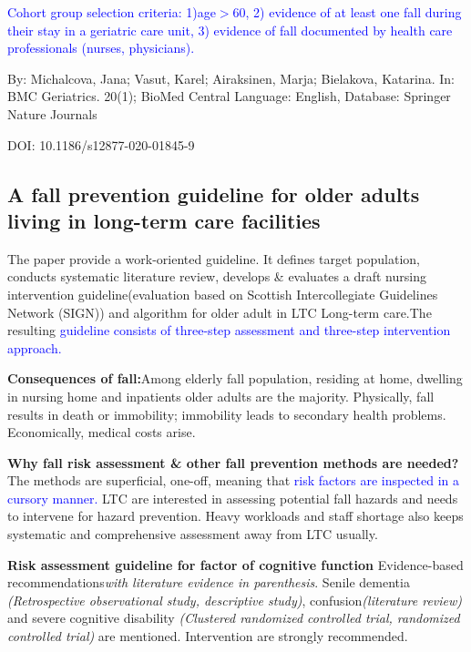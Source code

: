 \documentclass{article}
\begin{document}
\textcolor{blue}{Cohort group selection criteria:
1)age$>$60, 2) evidence of at least one fall during their stay in a geriatric care unit, 3) evidence of fall documented by health care professionals (nurses, physicians)\cite{Michalcova_2020}.} 
\begin{flushleft}

By: Michalcova, Jana; Vasut, Karel; Airaksinen, Marja; Bielakova, Katarina. In: BMC Geriatrics. 20(1); BioMed Central Language: English, Database: Springer Nature Journals \par
DOI: 10.1186/s12877-020-01845-9

\end{flushleft}

\subsection{A fall prevention guideline for older adults living in long-term care facilities}


The paper provide a work-oriented guideline. It defines target population, conducts systematic literature review, develops \& evaluates a draft nursing intervention guideline(evaluation based on Scottish Intercollegiate Guidelines Network (SIGN)) and algorithm for older adult in LTC Long-term care.The resulting \textcolor{blue}{guideline consists of three-step assessment and three-step intervention approach.}

\textbf{Consequences of fall:}Among elderly fall population, residing at home, dwelling in nursing home and inpatients older adults are the majority. Physically, fall results in death or immobility; immobility leads to secondary health problems. Economically, medical costs arise. 

\textbf{Why fall risk assessment \& other fall prevention methods are needed?} The methods are superficial, one-off, meaning that \textcolor{blue}{risk factors are inspected in a cursory manner.} LTC are interested in assessing potential fall hazards and needs to intervene for hazard prevention. Heavy workloads and staff shortage also keeps systematic and comprehensive assessment away from LTC usually.

\textbf{Risk assessment guideline for factor of cognitive function} Evidence-based recommendations\emph{with literature evidence in parenthesis}. Senile dementia \emph{(Retrospective observational study, descriptive study)}, confusion\emph{(literature review)} and severe cognitive disability \emph{(Clustered randomized controlled trial, randomized controlled trial)} are mentioned. Intervention are strongly recommended. 
\end{document}
